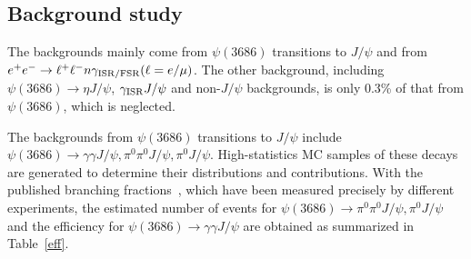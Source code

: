 \documentclass[prd,twocolumn,showpacs,amsmath,amssymb]{revtex4-1}
\begin{document}
\subsection{Background study}\label{background}

The backgrounds mainly come from $\psi(3686)$ transitions to $J/\psi$ and from $e^{+}e^{-}\rightarrow \ell^{+}\ell^{-} n\gamma_{\rm ISR/FSR} (\ell=e/\mu)$. The other background, including $\psi(3686)\to\eta J/\psi$, $\gamma_{\rm ISR}J/\psi$ and non-$J/\psi$ backgrounds, is only 0.3\% of that from $\psi(3686)$, which is neglected.

The backgrounds from $\psi(3686)$ transitions to $J/\psi$ include $\psi(3686)\to\gamma\gamma J/\psi, \pi^{0}\pi^{0}J/\psi,\pi^{0}J/\psi$.
High-statistics MC samples of these decays are generated to determine their distributions and contributions.
With the published branching fractions~\cite{PDG}, which have been measured precisely by different experiments,
the estimated number of events for $\psi(3686)\rightarrow\pi^{0}\pi^{0}J/\psi, \pi^{0}J/\psi$ and the efficiency
for $\psi(3686)\rightarrow\gamma\gamma J/\psi$ are obtained as summarized in Table~\ref{eff}.
\end{document}

